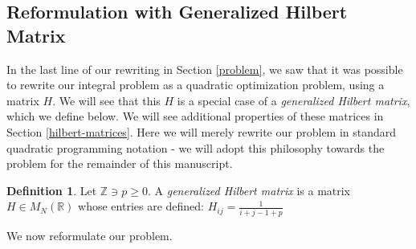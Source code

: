 \documentclass{article}
\theoremstyle{definition}
\newtheorem{defn}[thm]{Definition}
\theoremstyle{remark}
\numberwithin{equation}{section}
\begin{document}
\subsection{Reformulation with Generalized Hilbert Matrix}
\label{reformulation-hilbert}
In the last line of our rewriting in Section \ref{problem}, we saw that it was possible to rewrite our integral problem as a quadratic optimization problem, using a matrix $H$. We will see that this $H$ is a special case of a \emph{generalized Hilbert matrix}, which we define below. We will see additional properties of these matrices in Section \ref{hilbert-matrices}. Here we will merely rewrite our problem in standard quadratic programming notation - we will adopt this philosophy towards the problem for the remainder of this manuscript. 
\begin{defn}\label{def-generalized-hilbert-matrix}
Let $\mathbb{Z} \ni p \ge 0$. A \emph{generalized Hilbert matrix} is a matrix $H\in M_N(\mathbb{R})$ whose entries are defined: 
$H_{ij} = \frac{1}{i+j-1+p}$
\end{defn}
We now reformulate our problem. 
\end{document}

